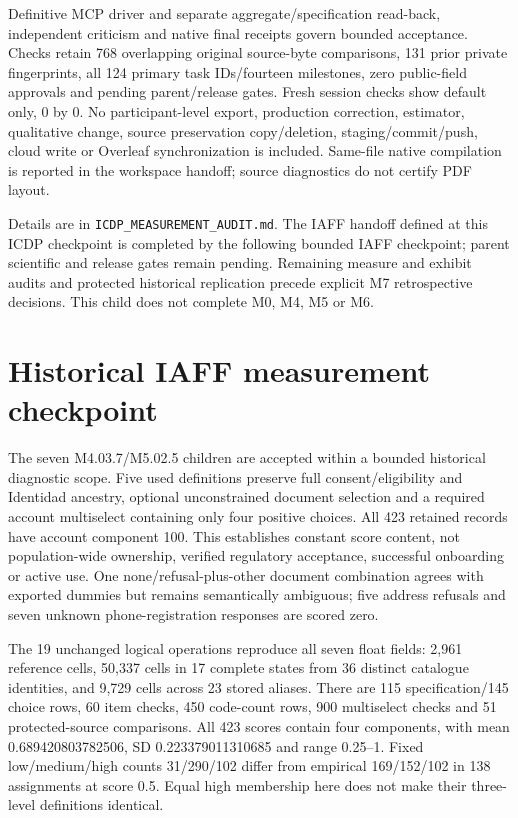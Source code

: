 \documentclass[11pt,a4paper]{article}
\begin{document}
Definitive MCP driver and separate aggregate/specification read-back,
independent criticism and native final receipts govern bounded acceptance.
Checks retain 768 overlapping original source-byte comparisons,
131 prior private fingerprints, all 124 primary task IDs/fourteen
milestones, zero public-field approvals and pending parent/release gates.
Fresh session checks show default only, 0 by 0. No participant-level
export, production correction, estimator, qualitative change, source
preservation copy/deletion, staging/commit/push, cloud write or Overleaf
synchronization is included. Same-file native compilation is reported
in the workspace handoff; source diagnostics do not certify PDF layout.

Details are in \texttt{ICDP\_MEASUREMENT\_AUDIT.md}. The IAFF handoff
defined at this ICDP checkpoint is completed by the following bounded
IAFF checkpoint; parent scientific and release gates remain pending.
Remaining measure and exhibit audits and protected historical replication
precede explicit M7 retrospective decisions. This child does not
complete M0, M4, M5 or M6.

\section{Historical IAFF measurement checkpoint}
The seven M4.03.7/M5.02.5 children are accepted within a bounded historical
diagnostic scope. Five used definitions preserve full consent/eligibility and
Identidad ancestry, optional unconstrained document selection and a required
account multiselect containing only four positive choices. All 423 retained
records have account component 100. This establishes constant score content,
not population-wide ownership, verified regulatory acceptance, successful
onboarding or active use. One none/refusal-plus-other document combination
agrees with exported dummies but remains semantically ambiguous; five address
refusals and seven unknown phone-registration responses are scored zero.

The 19 unchanged logical operations reproduce all seven float fields:
2,961 reference cells, 50,337 cells in 17 complete states from 36 distinct
catalogue identities, and 9,729 cells across 23 stored aliases. There are
115 specification/145 choice rows, 60 item checks, 450 code-count rows,
900 multiselect checks and 51 protected-source comparisons. All 423 scores
contain four components, with mean 0.689420803782506, SD 0.223379011310685 and
range 0.25--1. Fixed low/medium/high counts 31/290/102 differ from empirical
169/152/102 in 138 assignments at score 0.5. Equal high membership here does
not make their three-level definitions identical.
\end{document}
